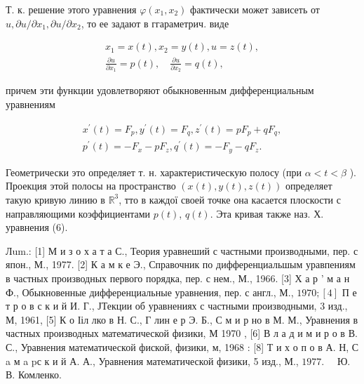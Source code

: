 \documentclass[10pt]{article}
\begin{document}
Т. к. решение этого уравнения $\varphi\left(x_{1}, x_{2}\right)$ фактически может зависеть от $u, \partial u / \partial x_{1}, \partial u / \partial x_{2}$, то ее задают в ггараметрич. виде



\[

\begin{gathered}

x_{1}=x(t), x_{2}=y(t), u=z(t), \\

\frac{\partial u}{\partial x_{1}}=p(t), \quad \frac{\partial u}{\partial x_{2}}=q(t),

\end{gathered}

\]



причем эти функции удовлетворяют обыкновенным дифференциальным уравнениям



\[

\begin{gathered}

x^{\prime}(t)=F_{p}, y^{\prime}(t)=F_{q}, z^{\prime}(t)=p F_{p}+q F_{q}, \\

p^{\prime}(t)=-F_{x}-p F_{z}, q^{\prime}(t)=-F_{y}-q F_{z} .

\end{gathered}

\]



Геометрически это определяет т. н. характеристическую полосу (при $\alpha<t<\beta$ ). Проекция этой полосы на пространство $(x(t), y(t), z(t))$ определяет такую кривую линию в $\mathbb{R}^{3}$, тто в каждої своей точке она касается плоскости с направляющими коэффициентами $p(t)$, $q(t)$. Эта кривая также наз. Х. уравнения (6).



Лum.: [1] М и з о х а т а С., Теория уравнеший с частными производными, пер. с япон., М., 1977. [2] К а м к е Э., Справочник по дифференциальшым уравпениям в частных производных первого порядка, пер. с нем., М., 1966. [3] Х а р ' м а н Ф., Обыкновенные дифференциальные уравнения, пер. с англ., М., $1970 ;[4]$ П е т р о в с к и й И. Г., ЈТекции об уравнениях с частными производными, 3 изд., М, 1961, [5] К о Ііл лко в Н. С., Г лин е р Э. Б., С м и р но в М. М., Уравнения в частных производных математической физики, М 1970 , [6] В л а д и м и р о в В. С., Уравнения математической фиской, физики, м, 1968 : [8] Т и х о п о в А. Н, С a м a pс к и й А. А., Уравнения математической физики, 5 изд., М., $1977 . \quad$ Ю. В. Комленко.
\end{document}

